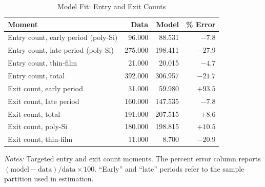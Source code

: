 \documentclass[12pt]{article}
\begin{document}
\begin{table}[htbp]
\centering
\small
\caption{Model Fit: Entry and Exit Counts}
\label{tab:moment_fit_entry_exit}
\begin{tabular}{lrrr}
\toprule
Moment & Data & Model & \% Error \\
\midrule
Entry count, early period (poly-Si) & 96.000 & 88.531 & $-7.8$ \\
Entry count, late period (poly-Si)  & 275.000 & 198.411 & $-27.9$ \\
Entry count, thin-film & 21.000 & 20.015 & $-4.7$ \\
Entry count, total & 392.000 & 306.957 & $-21.7$ \\
\addlinespace
Exit count, early period & 31.000 & 59.980 & $+93.5$ \\
Exit count, late period & 160.000 & 147.535 & $-7.8$ \\
Exit count, total & 191.000 & 207.515 & $+8.6$ \\
Exit count, poly-Si & 180.000 & 198.815 & $+10.5$ \\
Exit count, thin-film & 11.000 & 8.700 & $-20.9$ \\
\bottomrule
\end{tabular}
\begin{minipage}{0.85\textwidth}
\footnotesize
\vspace{0.5em}
\textit{Notes:} Targeted entry and exit count moments. The percent error column reports $(\text{model} - \text{data})/\text{data} \times 100$. ``Early'' and ``late'' periods refer to the sample partition used in estimation.
\end{minipage}
\end{table}
 
\end{document}
